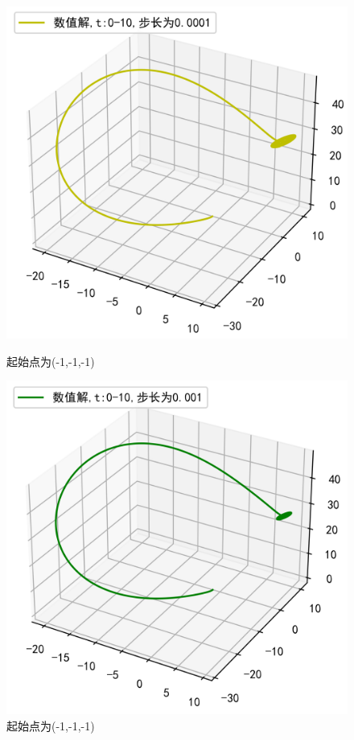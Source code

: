 \documentclass[a4paper]{article}%
\begin{document}
\begin{figure}[h]
    \begin{minipage}{0.48\linewidth}
    \centering
    \includegraphics[scale=0.65]{81}
    \caption{起始点为(-1,-1,-1)}
    \end{minipage}
    \begin{minipage}{0.48\linewidth}
    \centering
    \includegraphics[scale=0.65]{82}
    \caption{起始点为(-1,-1,-1)}
    \end{minipage}
\end{figure}
\end{document}

